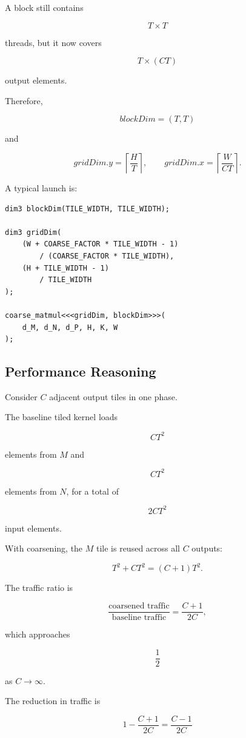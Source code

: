 \documentclass[11pt]{article}
\begin{document}
A block still contains

\[
T\times T
\]

threads, but it now covers

\[
T\times(CT)
\]

output elements.

Therefore,

\[
\boxed{
blockDim=(T,T)
}
\]

and

\[
\boxed{
gridDim.y
=
\left\lceil\frac{H}{T}\right\rceil,
\qquad
gridDim.x
=
\left\lceil\frac{W}{CT}\right\rceil.
}
\]

A typical launch is:

\begin{lstlisting}
dim3 blockDim(TILE_WIDTH, TILE_WIDTH);

dim3 gridDim(
    (W + COARSE_FACTOR * TILE_WIDTH - 1)
        / (COARSE_FACTOR * TILE_WIDTH),
    (H + TILE_WIDTH - 1)
        / TILE_WIDTH
);

coarse_matmul<<<gridDim, blockDim>>>(
    d_M, d_N, d_P, H, K, W
);
\end{lstlisting}

\subsection{Performance Reasoning}

Consider \(C\) adjacent output tiles in one phase.

The baseline tiled kernel loads

\[
CT^2
\]

elements from \(M\) and

\[
CT^2
\]

elements from \(N\), for a total of

\[
\boxed{
2CT^2
}
\]

input elements.

With coarsening, the \(M\) tile is reused across all \(C\) outputs:

\[
T^2 + CT^2
=
\boxed{
(C+1)T^2
}.
\]

The traffic ratio is

\[
\frac{\text{coarsened traffic}}
{\text{baseline traffic}}
=
\frac{C+1}{2C},
\]

which approaches

\[
\frac{1}{2}
\]

as \(C\rightarrow\infty\).

The reduction in traffic is

\[
\boxed{
1-\frac{C+1}{2C}
=
\frac{C-1}{2C}
}
\]
\end{document}
